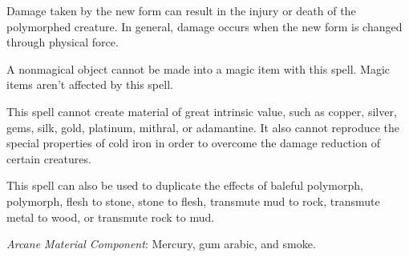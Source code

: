 {	Damage taken by the new form can result in the injury or death of the polymorphed creature. In general, damage occurs when the new form is changed through physical force.

	A nonmagical object cannot be made into a magic item with this spell. Magic items aren't affected by this spell.

	This spell cannot create material of great intrinsic value, such as copper, silver, gems, silk, gold, platinum, mithral, or adamantine. It also cannot reproduce the special properties of cold iron in order to overcome the damage reduction of certain creatures.

	This spell can also be used to duplicate the effects of baleful polymorph, polymorph, flesh to stone, stone to flesh, transmute mud to rock, transmute metal to wood, or transmute rock to mud.

	\textit{Arcane Material Component}:
	Mercury, gum arabic, and smoke.

}
